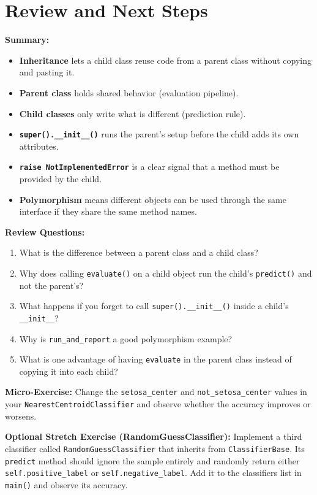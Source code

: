 \section{Review and Next Steps}

\textbf{Summary:}
\begin{itemize}
    \item \textbf{Inheritance} lets a child class reuse code from a parent class without copying and pasting it.
    \item \textbf{Parent class} holds shared behavior (evaluation pipeline).
    \item \textbf{Child classes} only write what is different (prediction rule).
    \item \textbf{\texttt{super().\_\_init\_\_()}} runs the parent's setup before the child adds its own attributes.
    \item \textbf{\texttt{raise NotImplementedError}} is a clear signal that a method must be provided by the child.
    \item \textbf{Polymorphism} means different objects can be used through the same interface if they share the same method names.
\end{itemize}

\textbf{Review Questions:}
\begin{enumerate}
    \item What is the difference between a parent class and a child class?
    \item Why does calling \texttt{evaluate()} on a child object run the child's \texttt{predict()} and not the parent's?
    \item What happens if you forget to call \texttt{super().\_\_init\_\_()} inside a child's \texttt{\_\_init\_\_}?
    \item Why is \texttt{run\_and\_report} a good polymorphism example?
    \item What is one advantage of having \texttt{evaluate} in the parent class instead of copying it into each child?
\end{enumerate}

\textbf{Micro-Exercise:} Change the \texttt{setosa\_center} and \texttt{not\_setosa\_center} values in your \texttt{NearestCentroidClassifier} and observe whether the accuracy improves or worsens.

\textbf{Optional Stretch Exercise (RandomGuessClassifier):}
Implement a third classifier called \texttt{RandomGuessClassifier} that inherits from \texttt{ClassifierBase}.
Its \texttt{predict} method should ignore the sample entirely and randomly return either \texttt{self.positive\_label} or \texttt{self.negative\_label}.
Add it to the classifiers list in \texttt{main()} and observe its accuracy.

